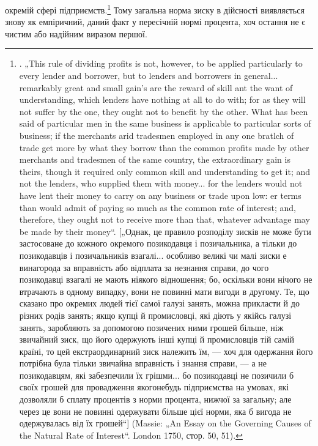\parcont{}  %
окремій сфері підприємств.\footnote{
. „This rule of dividing profits is not, however, to be applied particularly to
every lender and borrower, but to lenders and borrowers in general... remarkably
great and small gain's are the reward of skill ant the want of understanding, which
lenders have nothing at all to do with; for as they will not suffer by the one,
they ought not to benefit by the other. What has been said of particular men in
the same business is applicable to particular sorts of business; if the merchants
arid tradesmen employed in any one bratlch of trade get more by what they borrow
than the common profits made by other merchants and tradesmen of the same
country, the extraordinary gain is theirs, though it required only common skill
and understanding to get it; and not the lenders, who supplied them with money...
for the lenders would not have lent their money to carry on any business or trade
upon low: er terms than would admit of paying so much as the common rate of
interest; and, therefore, they ought not to receive more than that, whatever advantage
may be made by their money“. [„Однак, це правило розподілу зисків не
може бути застосоване до кожного окремого позикодавця і позичальника, а
тільки до позикодавців і позичальників взагалі... особливо великі чи малі зиски
е винагорода за вправність або відплата за незнання справи, до чого позикодавці
взагалі не мають ніякого відношення; бо, оскільки вони нічого не втрачають
в одному випадку, вони не повинні мати вигоди в другому. Те, що сказано
про окремих людей тієї самої галузі занять, можна прикласти й до різних
родів занять; якщо купці й промисловці, які діють у якійсь галузі занять, заробляють
за допомогою позичених ними грошей більше, ніж звичайний зиск,
що його одержують інші купці й промисловців тій самій країні, то цей екстраординарний
зиск належить їм, — хоч для одержання його потрібна була тільки
звичайна вправність і знання справи, — а не позикодавцям, які забезпечили
їх грішми... бо позикодавці не позичили б своїх грошей для провадження якогонебудь
підприємства на умовах, які дозволяли б сплату процентів з норми
процента, нижчої за загальну; але через це вони не повинні одержувати більше
цієї норми, яка б вигода не одержувалась від їх грошей“] (Massie: „An
Essay on the Governing Causes of the Natural Rate of Interest“. London 1750,
стор. 50, 51).
} Тому загальна норма зиску в дійсності
виявляється знову як емпіричний, даний факт у пересічній
нормі процента, хоч остання не є чистим або надійним виразом
першої.

